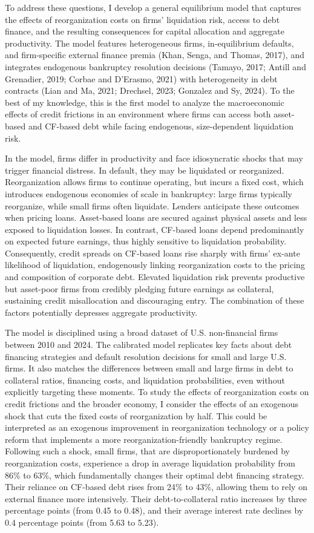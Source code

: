 \documentclass[12pt]{article}
\begin{document}
To address these questions, I develop a general equilibrium model that captures the effects of reorganization costs on firms' liquidation risk, access to debt finance, and the resulting consequences for capital allocation and aggregate productivity. The model features heterogeneous firms, in-equilibrium defaults, and firm-specific external finance premia (Khan, Senga, and Thomas, 2017), and integrates endogenous bankruptcy resolution decisions (Tamayo, 2017; Antill and Grenadier, 2019; Corbae and D'Erasmo, 2021) with heterogeneity in debt contracts (Lian and Ma, 2021; Drechsel, 2023; Gonzalez and Sy, 2024). To the best of my knowledge, this is the first model to analyze the macroeconomic effects of credit frictions in an environment where firms can access both asset-based and CF-based debt while facing endogenous, size-dependent liquidation risk.

In the model, firms differ in productivity and face idiosyncratic shocks that may trigger financial distress. In default, they may be liquidated or reorganized. Reorganization allows firms to continue operating, but incurs a fixed cost, which introduces endogenous economies of scale in bankruptcy: large firms typically reorganize, while small firms often liquidate. Lenders anticipate these outcomes when pricing loans. Asset-based loans are secured against physical assets and less exposed to liquidation losses. In contrast, CF-based loans depend predominantly on expected future earnings, thus highly sensitive to liquidation probability. Consequently, credit spreads on CF-based loans rise sharply with firms' ex-ante likelihood of liquidation, endogenously linking reorganization costs to the pricing and composition of corporate debt. Elevated liquidation risk prevents productive but asset-poor firms from credibly pledging future earnings as collateral, sustaining credit misallocation and discouraging entry. The combination of these factors potentially depresses aggregate productivity.

The model is disciplined using a broad dataset of U.S. non-financial firms between 2010 and 2024. The calibrated model replicates key facts about debt financing strategies and default resolution decisions for small and large U.S. firms. It also matches the differences between small and large firms in debt to collateral ratios, financing costs, and liquidation probabilities, even without explicitly targeting these moments. To study the effects of reorganization costs on credit frictions and the broader economy, I consider the effects of an exogenous shock that cuts the fixed costs of reorganization by half. This could be interpreted as an exogenous improvement in reorganization technology or a policy reform that implements a more reorganization-friendly bankruptcy regime. Following such a shock, small firms, that are disproportionately burdened by reorganization costs, experience a drop in average liquidation probability from 86\% to 63\%, which fundamentally changes their optimal debt financing strategy. Their reliance on CF-based debt rises from 24\% to 43\%, allowing them to rely on external finance more intensively. Their debt-to-collateral ratio increases by three percentage points (from 0.45 to 0.48), and their average interest rate declines by 0.4 percentage points (from 5.63 to 5.23).
\end{document}
